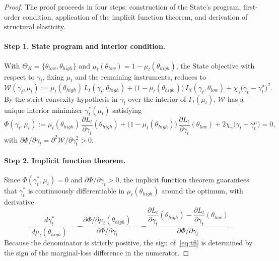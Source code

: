 \documentclass[12pt,a4paper]{article}
\theoremstyle{plain}
\theoremstyle{definition}
\theoremstyle{remark}
\newcommand{\1}{\mathbf{1}}
\begin{document}
\begin{proof}
The proof proceeds in four steps: construction of the State's program, first-order
condition, application of the implicit function theorem, and derivation of structural
elasticity.

\paragraph{Step 1. State program and interior condition.}
With $\Theta_K=\{\theta_{low},\theta_{high}\}$ and
$\mu_t(\theta_{low})=1-\mu_t(\theta_{high})$, the State objective with respect to
$\gamma_t$, fixing $\mu_t$ and the remaining instruments, reduces to
\begin{equation}
\label{eq:obj-gamma}
\mathcal{W}(\gamma_t,\mu_t)
:= \mu_t(\theta_{high})\,L_t(\gamma_t,\theta_{high})
 + \bigl(1-\mu_t(\theta_{high})\bigr)\,L_t(\gamma_t,\theta_{low})
 + \chi_\gamma\bigl(\gamma_t-\gamma_t^\mu\bigr)^2.
\end{equation}
By the strict convexity hypothesis in $\gamma_t$ over the interior of
$\Gamma_t(\mu_t)$, $\mathcal{W}$ has a unique interior minimizer
$\gamma_t^\ast(\mu_t)$ satisfying
\begin{equation}
\label{eq:foc-gamma}
\Phi(\gamma_t,\mu_t)
:= \mu_t(\theta_{high})\,\frac{\partial L_t}{\partial\gamma_t}(\theta_{high})
 + \bigl(1-\mu_t(\theta_{high})\bigr)\,
   \frac{\partial L_t}{\partial\gamma_t}(\theta_{low})
 + 2\chi_\gamma\bigl(\gamma_t-\gamma_t^\mu\bigr)
= 0,
\end{equation}
with $\partial\Phi/\partial\gamma_t = \partial^2\mathcal{W}/\partial\gamma_t^2 > 0$.

\paragraph{Step 2. Implicit function theorem.}
Since $\Phi(\gamma_t^\ast,\mu_t)=0$ and $\partial\Phi/\partial\gamma_t>0$, the implicit
function theorem guarantees that $\gamma_t^\ast$ is continuously differentiable in
$\mu_t(\theta_{high})$ around the optimum, with derivative
\begin{equation}
\label{eq:tfi}
\frac{d\gamma_t^\ast}{d\mu_t(\theta_{high})}
= -\frac{\partial\Phi/\partial\mu_t(\theta_{high})}
        {\partial\Phi/\partial\gamma_t}
= -\frac{
    \dfrac{\partial L_t}{\partial\gamma_t}(\theta_{high})
    -\dfrac{\partial L_t}{\partial\gamma_t}(\theta_{low})
  }{
    \partial\Phi/\partial\gamma_t
  }.
\end{equation}
Because the denominator is strictly positive, the sign of~\eqref{eq:tfi} is determined
by the sign of the marginal-loss difference in the numerator.


\end{proof}
\end{document}
